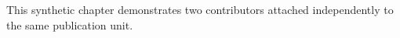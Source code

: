 This synthetic chapter demonstrates two contributors attached independently to the same publication unit.
